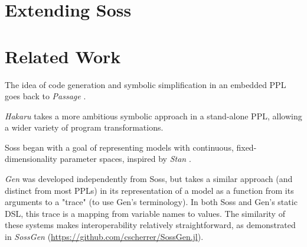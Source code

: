 \documentclass[anonymous=false, %
               format=acmsmall, %
               review=true, %
               screen=true, %
               nonacm=true]{acmart}
\begin{document}
  

  
  


\section{Extending Soss}

\section{Related Work}

The idea of code generation and symbolic simplification in an embedded PPL goes back to \emph{Passage} \cite{Scherrer2012}. 

\emph{Hakaru} \cite{narayanan2016probabilistic} takes a more ambitious symbolic approach in a stand-alone PPL, allowing a wider variety of program transformations. 

Soss began with a goal of representing models with continuous, fixed-dimensionality parameter spaces, inspired by \emph{Stan} \cite{stan:2017}.

\emph{Gen} \cite{Cusumano-Towner:2019} was developed independently from Soss, but takes a similar approach (and distinct from most PPLs) in its representation of a model as a function from its arguments to a "trace" (to use Gen's terminology). In both Soss and Gen's static DSL, this trace is a mapping from variable names to values. The similarity of these systems makes interoperability relatively straightforward, as demonstrated in \emph{SossGen} (\url{https://github.com/cscherrer/SossGen.jl}).
\end{document}
